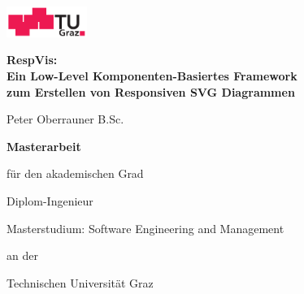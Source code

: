 

\cleardoublepage

\begin{otherlanguage}{austrian}

\vspace*{-3cm}

\begin{center}
\includegraphics[height=1cm]{diagrams/tugraz-logo.pdf}

\vspace{2cm}

\begin{spacing}{1.1}
\huge\sffamily\bfseries
RespVis:\\
Ein Low-Level Komponenten-Basiertes Framework\\
zum Erstellen von Responsiven SVG Diagrammen
\end{spacing}

\vspace{2cm}

{\Large\sffamily Peter Oberrauner B.Sc.}

\vspace{2cm}

{\Large\sffamily\bfseries Masterarbeit}

\vspace{5mm}

{\small\sffamily für den akademischen Grad}

\vspace{5mm}

{\normalsize\sffamily Diplom-Ingenieur}

\vspace{5mm}

{\normalsize\sffamily
Masterstudium: Software Engineering and Management
}


\vspace{1cm}

{\small\sffamily an der}

\vspace{5mm}

{\large\sffamily Technischen Universität Graz}



\vspace{1cm}


\end{center}
\end{otherlanguage}
